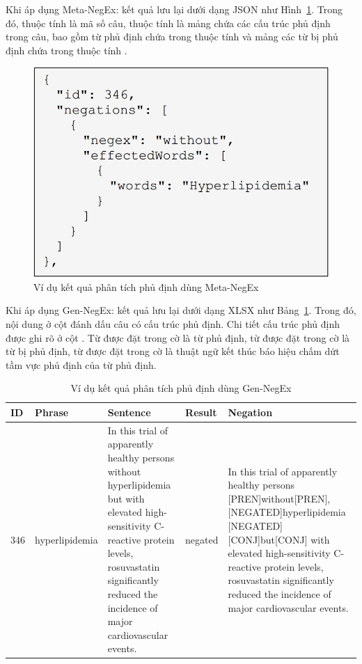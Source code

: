 Khi áp dụng Meta-NegEx: kết quả lưu lại dưới dạng JSON như Hình~\ref{fig:Meta-NegEx}. Trong đó, thuộc tính  là mã số câu, thuộc tính  là mảng chứa các cấu trúc phủ định trong câu, bao gồm từ phủ định chứa trong thuộc tính  và mảng các từ bị phủ định chứa trong thuộc tính .\\

\begin{figure}[h]
\centering
\includegraphics[scale=0.35]{../hinh/JSON.png}
\caption{Ví dụ kết quả phân tích phủ định dùng Meta-NegEx}
\label{fig:Meta-NegEx}
\end{figure}

Khi áp dụng Gen-NegEx: kết quả lưu lại dưới dạng XLSX như Bảng~\ref{table:Gen-NegEx}. Trong đó, nội dung  ở cột  đánh dấu câu có cấu trúc phủ định. Chi tiết cấu trúc phủ định được ghi rõ ở cột . Từ được đặt trong cờ \xquote{[PREN]} là từ phủ định, từ được đặt trong cờ \xquote{[NEGATED]} là từ bị phủ định, từ được đặt trong cờ \xquote{[CONJ]} là thuật ngữ kết thúc báo hiệu chấm dứt tầm vực phủ định của từ phủ định.\\

\begin{table}[h]
\centering
\caption{Ví dụ kết quả phân tích phủ định dùng Gen-NegEx}
\label{table:Gen-NegEx}
\begin{tabular}{|l|l|m{}|l|m{}|}
\hline
ID & Phrase & Sentence & Result & Negation \\ \hline
346 & hyperlipidemia & In this trial of apparently healthy persons without hyperlipidemia but with elevated high-sensitivity C-reactive protein levels, rosuvastatin significantly reduced the incidence of major cardiovascular events. & negated & In this trial of apparently healthy persons {[}PREN{]}without{[}PREN{]}, {[}NEGATED{]}hyperlipidemia {[}NEGATED{]} {[}CONJ{]}but{[}CONJ{]} with elevated high-sensitivity C-reactive protein levels, rosuvastatin significantly reduced the incidence of major cardiovascular events. \\ \hline
\end{tabular}
\end{table}

